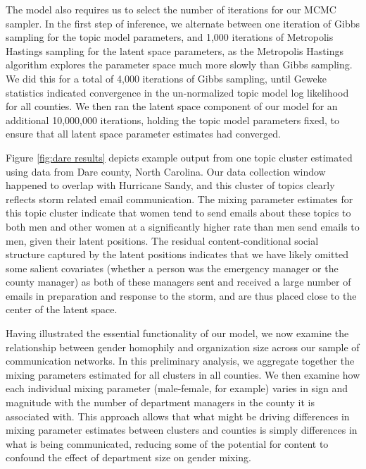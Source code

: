 \documentclass{pnastwo}
\begin{document}
\begin{article}
The model also requires us to select the number of iterations for our MCMC sampler. In the first step of inference, we alternate between one iteration of Gibbs sampling for the topic model parameters, and 1,000 iterations of Metropolis Hastings sampling for the latent space parameters, as the Metropolis Hastings algorithm explores the parameter space much more slowly than Gibbs sampling. We did this for a total of 4,000 iterations of Gibbs sampling, until Geweke statistics indicated convergence in the un-normalized topic model log likelihood for all counties. We then ran the latent space component of our model for an additional 10,000,000 iterations, holding the topic model parameters fixed, to ensure that all latent space parameter estimates had converged. 

Figure \ref{fig:dare results} depicts example output from one topic cluster estimated using data from Dare county, North Carolina. Our data collection window happened to overlap with Hurricane Sandy, and this cluster of topics clearly reflects storm related email communication. The mixing parameter estimates for this topic cluster indicate that women tend to send emails about these topics to both men and other women at a significantly higher rate than men send emails to men, given their latent positions. The residual content-conditional social structure captured by the latent positions indicates that we have likely omitted some salient covariates (whether a person was the emergency manager or the county manager) as both of these managers sent and received a large number of emails in preparation and response to the storm, and are thus placed close to the center of the latent space.




Having illustrated the essential functionality of our model, we now examine the relationship between gender homophily and organization size across our sample of communication networks. In this preliminary analysis, we aggregate together the mixing parameters estimated for all clusters in all counties. We then examine how each individual mixing parameter (male-female, for example) varies in sign and magnitude with the number of department managers in the county it is associated with. This approach allows that what might be driving differences in mixing parameter estimates between clusters and counties is simply differences in what is being communicated, reducing some of the potential for content to confound the effect of department size on gender mixing. 


\end{article}
\end{document}
